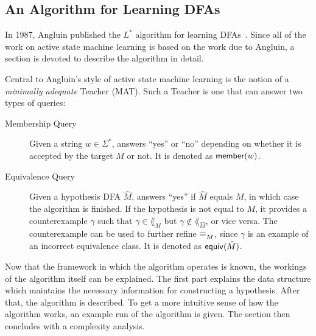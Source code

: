 \subsection{An Algorithm for Learning DFAs}
\label{sec:an-algor-learn}
In 1987, Angluin published the $L^*$ algorithm for learning
DFAs~\cite{Angluin1987}. Since all of the work on active state machine learning is
based on the work due to Angluin, a section is devoted to describe the algorithm
in detail.

Central to Angluin's style of active state machine learning is the notion of a
\textit{minimally adequate} Teacher (MAT). Such a Teacher is one that can answer
two types of queries:

\begin{description}
\item[Membership Query] Given a string $w \in \Sigma^*$, answers ``yes'' or
  ``no'' depending on whether it is accepted by the target $M$ or not. It is
  denoted as $\mathsf{member}(w)$.
\item[Equivalence Query] Given a hypothesis DFA $\hat M$, answers ``yes'' if
  $\hat M$ equals $M$, in which case the algorithm is finished. If the
  hypothesis is not equal to $M$, it provides a counterexample $\gamma$ such
  that $\gamma \in \lang_M$ but $\gamma \not\in \lang_{\hat M}$, or vice
  versa. The counterexample can be used to further refine $\equiv_{\hat M}$,
  since $\gamma$ is an example of an incorrect equivalence class. It is denoted
  as $\mathsf{equiv}(\hat M)$.
\end{description}

Now that the framework in which the algorithm operates is known, the workings of
the algorithm itself can be explained. The first part explains the data
structure which maintains the necessary information for constructing a
hypothesis. After that, the algorithm is described. To get a more intuitive
sense of how the algorithm works, an example run of the algorithm is given. The
section then concludes with a complexity analysis.

\newpage
